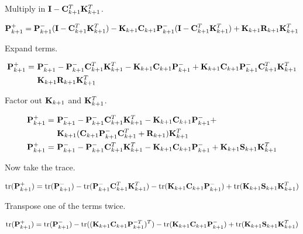 Multiply in $\mathbf{I} - \mathbf{C}_{k+1}^T\mathbf{K}_{k+1}^T$.

\begin{equation*}
  \mathbf{P}_{k+1}^+ =
    \mathbf{P}_{k+1}^-(\mathbf{I} - \mathbf{C}_{k+1}^T\mathbf{K}_{k+1}^T) -
    \mathbf{K}_{k+1}\mathbf{C}_{k+1}\mathbf{P}_{k+1}^-
    (\mathbf{I} - \mathbf{C}_{k+1}^T\mathbf{K}_{k+1}^T) +
    \mathbf{K}_{k+1}\mathbf{R}_{k+1} \mathbf{K}_{k+1}^T
\end{equation*}

Expand terms.

\begin{align*}
  \mathbf{P}_{k+1}^+ =~&
    \mathbf{P}_{k+1}^- - \mathbf{P}_{k+1}^-\mathbf{C}_{k+1}^T\mathbf{K}_{k+1}^T -
    \mathbf{K}_{k+1}\mathbf{C}_{k+1}\mathbf{P}_{k+1}^- +
    \mathbf{K}_{k+1}\mathbf{C}_{k+1}\mathbf{P}_{k+1}^-\mathbf{C}_{k+1}^T\mathbf{K}_{k+1}^T \\
    &\mathbf{K}_{k+1}\mathbf{R}_{k+1} \mathbf{K}_{k+1}^T
\end{align*}

Factor out $\mathbf{K}_{k+1}$ and $\mathbf{K}_{k+1}^T$.

\begin{align}
  \mathbf{P}_{k+1}^+ =~&
    \mathbf{P}_{k+1}^- - \mathbf{P}_{k+1}^-\mathbf{C}_{k+1}^T\mathbf{K}_{k+1}^T -
    \mathbf{K}_{k+1}\mathbf{C}_{k+1}\mathbf{P}_{k+1}^- + \nonumber \\
    &\mathbf{K}_{k+1}(\mathbf{C}_{k+1}\mathbf{P}_{k+1}^-\mathbf{C}_{k+1}^T +
    \mathbf{R}_{k+1})\mathbf{K}_{k+1}^T \nonumber \\
  \mathbf{P}_{k+1}^+ =~&
    \mathbf{P}_{k+1}^- - \mathbf{P}_{k+1}^-\mathbf{C}_{k+1}^T\mathbf{K}_{k+1}^T -
    \mathbf{K}_{k+1}\mathbf{C}_{k+1}\mathbf{P}_{k+1}^- +
    \mathbf{K}_{k+1}\mathbf{S}_{k+1}\mathbf{K}_{k+1}^T \label{eq:post_p_update}
\end{align}

Now take the trace.

\begin{equation*}
  \operatorname{tr}(\mathbf{P}_{k+1}^+) =
    \operatorname{tr}(\mathbf{P}_{k+1}^-) - \operatorname{tr}(\mathbf{P}_{k+1}^-\mathbf{C}_{k+1}^T\mathbf{K}_{k+1}^T) -
    \operatorname{tr}(\mathbf{K}_{k+1}\mathbf{C}_{k+1}\mathbf{P}_{k+1}^-) +
    \operatorname{tr}(\mathbf{K}_{k+1}\mathbf{S}_{k+1}\mathbf{K}_{k+1}^T)
\end{equation*}

Transpose one of the terms twice.

\begin{equation*}
  \operatorname{tr}(\mathbf{P}_{k+1}^+) = \operatorname{tr}(\mathbf{P}_{k+1}^-) -
    \operatorname{tr}((\mathbf{K}_{k+1}\mathbf{C}_{k+1}\mathbf{P}_{k+1}^{-T})^T) -
    \operatorname{tr}(\mathbf{K}_{k+1}\mathbf{C}_{k+1}\mathbf{P}_{k+1}^-) +
    \operatorname{tr}(\mathbf{K}_{k+1}\mathbf{S}_{k+1}\mathbf{K}_{k+1}^T)
\end{equation*}

